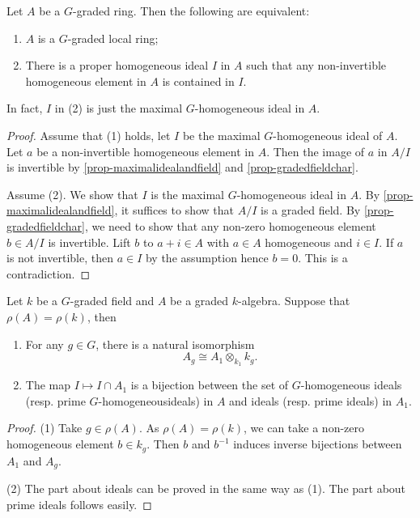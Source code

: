 \begin{lemma}\label{lma-rhoconditionimplygraded}
    Let $A$ be a $G$-graded ring. Then the following are equivalent:
    \begin{enumerate}
        \item $A$ is a $G$-graded local ring;
        \item There is a proper homogeneous ideal $I$ in $A$ such that any non-invertible homogeneous element in $A$ is contained in $I$.
    \end{enumerate}
    In fact, $I$ in (2) is just the maximal $G$-homogeneous ideal in $A$.
\end{lemma}
\begin{proof}
    Assume that (1) holds, let $I$ be the maximal $G$-homogeneous ideal of $A$. Let $a$ be a non-invertible homogeneous element in $A$. Then the image of $a$ in $A/I$ is invertible by \cref{prop-maximalidealandfield} and \cref{prop-gradedfieldchar}.

    Assume (2). We show that $I$ is the maximal $G$-homogeneous ideal in $A$. By \cref{prop-maximalidealandfield}, it suffices to show that $A/I$ is a graded field. By \cref{prop-gradedfieldchar}, we need to show that any non-zero homogeneous element $b\in A/I$ is invertible. Lift $b$ to $a+i\in A$ with $a\in A$ homogeneous and $i\in I$. If $a$ is not invertible, then $a\in I$ by the assumption hence $b=0$. This is a contradiction.
\end{proof}


\begin{lemma}\label{lma-rhoAequalrhok}
    Let $k$ be a $G$-graded field and $A$ be a graded $k$-algebra. Suppose that $\rho(A)=\rho(k)$, then
    \begin{enumerate}
        \item For any $g\in G$, there is a natural isomorphism
            \[
                A_g\cong A_1 \otimes_{k_1} k_g.
            \]
        \item The map $I\mapsto I\cap A_1$ is a bijection between the set of $G$-homogeneous ideals (resp. prime $G$-homogeneousideals) in $A$ and ideals (resp. prime ideals) in $A_1$.
    \end{enumerate}
\end{lemma}
\begin{proof}
    (1) Take $g\in \rho(A)$. As $\rho(A)=\rho(k)$, we can take a non-zero homogeneous element $b\in k_g$. Then $b$ and $b^{-1}$ induces inverse bijections between $A_1$ and $A_g$.

    (2) The part about ideals can be proved in the same way as (1). The part about prime ideals follows easily.
\end{proof}

